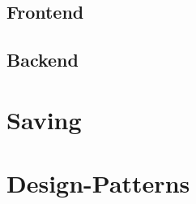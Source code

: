 \subsection{Frontend}


\subsection{Backend}


\section{Saving}


\section{Design-Patterns}
\label{sec:design-patterns}
